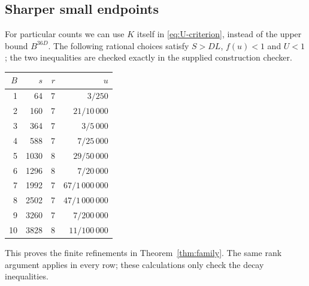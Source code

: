 \subsection{Sharper small endpoints}

For particular counts we can use $K$ itself in
\eqref{eq:U-criterion}, instead of the upper bound $B^{36D}$.
The following rational choices satisfy $S>DL$, $f(u)<1$ and
$U<1$; the two inequalities are checked exactly in the supplied
construction checker.
\begin{center}
\begin{tabular}{@{}rrrr@{}}
\toprule
$B$ & $s$ & $r$ & $u$\\
\midrule
1&64&7&$3/250$\\
2&160&7&$21/10\,000$\\
3&364&7&$3/5\,000$\\
4&588&7&$7/25\,000$\\
5&1030&8&$29/50\,000$\\
6&1296&8&$7/20\,000$\\
7&1992&7&$67/1\,000\,000$\\
8&2502&7&$47/1\,000\,000$\\
9&3260&7&$7/200\,000$\\
10&3828&8&$11/100\,000$\\
\bottomrule
\end{tabular}
\end{center}
This proves the finite refinements in Theorem~\ref{thm:family}.
The same rank argument applies in every row; these calculations
only check the decay inequalities.
